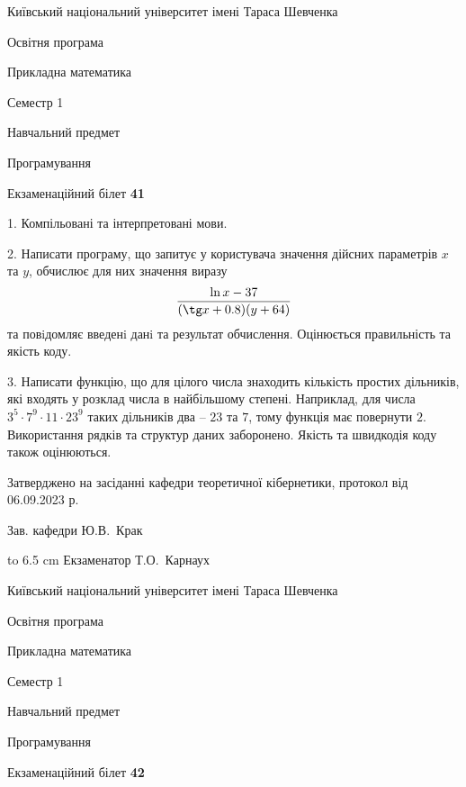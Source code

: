 \documentclass[12pt, ukrainian]{article}
\begin{document}
{{\begin {scriptsize}\par
{ \center  Київський національний університет імені Тараса Шевченка \par}
{\parbox {5 cm}{Освітня програма \hfill}{\parbox {7 cm}{Прикладна математика\hfill}}\parbox {6 cm}{\hfill Семестр 1}}\par
{\parbox {5 cm} {Навчальний предмет \hfill}\parbox {7 cm}{Програмування \hfill}\parbox {6cm}{\hfill}\par}\vspace{-15pt} \end{scriptsize}}{\center Екзаменаційний білет \No \textbf { 41 }\par}}
{%
1. Компільовані та інтерпретовані мови.%
\par
2. Написати програму, що запитує у користувача значення дійсних параметрів $x$ та $y$, обчислює для них значення виразу 
$$\frac{\ln x - 37}{(\tg x + 0.8) (y + 64)}$$ 
та повiдомляє введенi данi та результат обчислення.
 Оцінюється правильність та якість коду.

\par
3. Написати функцію, що для цілого числа знаходить кількість простих дільників, які входять у розклад числа в найбільшому степені. Наприклад, для числа $3^5{\cdot}7^9{\cdot}11{\cdot}23^{9}$ таких дільників два – $23$ та $7$, тому функція має повернути $2$.  Використання рядків та структур даних заборонено. Якість та швидкодія коду також оцінюються. 

}
{\smallskip\smallskip \begin {scriptsize} Затверджено на засіданні кафедри теоретичної кібернетики, протокол   від   06.09.2023 р.\par\smallskip\smallskip\smallskip\smallskip
{\parbox {6.5 cm} {Зав. кафедри \dotfill Ю.В.~Крак}}\hspace {0.7cm} {\hbox to 6.5 cm { Екзаменатор \dotfill Т.О.~Карнаух}} \end{scriptsize}}
\vspace{0.9cm}
{{\begin {scriptsize}\par
{ \center  Київський національний університет імені Тараса Шевченка \par}
{\parbox {5 cm}{Освітня програма \hfill}{\parbox {7 cm}{Прикладна математика\hfill}}\parbox {6 cm}{\hfill Семестр 1}}\par
{\parbox {5 cm} {Навчальний предмет \hfill}\parbox {7 cm}{Програмування \hfill}\parbox {6cm}{\hfill}\par}\vspace{-15pt} \end{scriptsize}}{\center Екзаменаційний білет \No \textbf { 42 }\par}}
\end{document}
